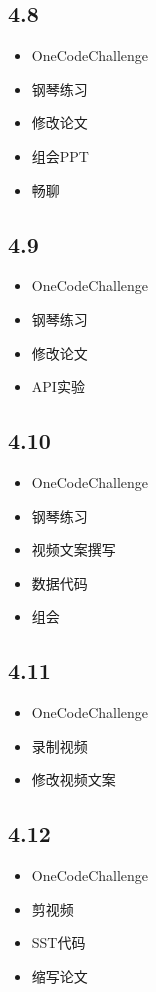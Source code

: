 \documentclass[UTF8]{ctexart}
\begin{document}
\subsection*{4.8}
\begin{itemize}
    \item OneCodeChallenge
    \item 钢琴练习
    \item 修改论文
    \item 组会PPT
    \item 畅聊
\end{itemize}

\subsection*{4.9}
\begin{itemize}
    \item OneCodeChallenge
    \item 钢琴练习
    \item 修改论文
    \item API实验
\end{itemize}

\subsection*{4.10}
\begin{itemize}
    \item OneCodeChallenge
    \item 钢琴练习
    \item 视频文案撰写
    \item 数据代码
    \item 组会
\end{itemize}

\subsection*{4.11}
\begin{itemize}
    \item OneCodeChallenge
    \item 录制视频
    \item 修改视频文案
\end{itemize}

\subsection*{4.12}
\begin{itemize}
    \item OneCodeChallenge
    \item 剪视频
    \item SST代码
    \item 缩写论文
\end{itemize}
\end{document}
